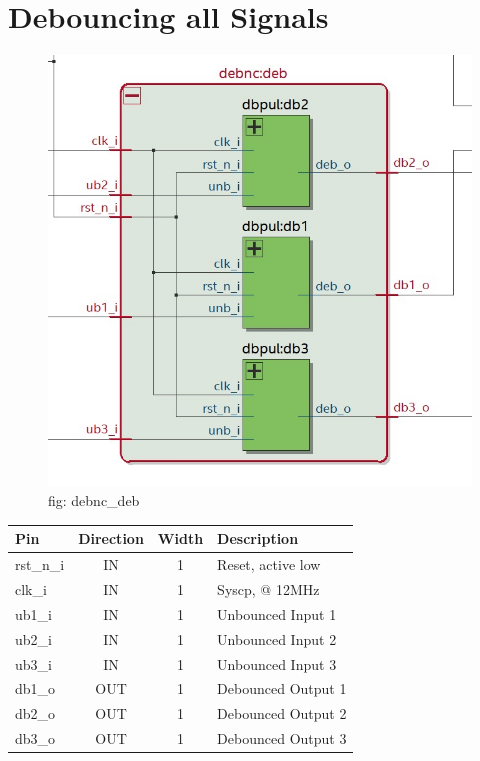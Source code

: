 \documentclass[12pt,a4 paper] {report}
\begin{document}
\section{Debouncing all Signals}	
\begin{figure}[h]
	\centering	
	\includegraphics[scale=0.3]{../png/debnc_deb.png}
	\newline
	fig: debnc\_deb \\
\end{figure}

\begin{center}
	\begin{tabular}{ | p{2cm} | c | c | p{5cm} |}
		\hline
		\textbf{Pin} & \textbf{Direction} & \textbf{Width} & \textbf{Description} \\
		\hline
	  rst\_n\_i & IN & 1 & Reset, active low\\
	  \hline
		clk\_i & IN & 1 & Syscp, @ 12MHz \\
		\hline
		ub1\_i & IN & 1 & Unbounced Input 1 \\
		\hline
		ub2\_i & IN & 1 & Unbounced Input 2 \\
		\hline
		ub3\_i & IN & 1 & Unbounced Input 3 \\
		\hline
		db1\_o & OUT & 1 & Debounced Output 1 \\
		\hline
		db2\_o & OUT & 1 & Debounced Output 2 \\
		\hline
		db3\_o & OUT & 1 & Debounced Output 3 \\
		\hline
	\end{tabular}
\end{center}
\end{document}
